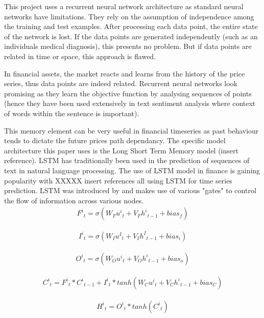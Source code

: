 \documentclass[11pt]{article}
\begin{document}
This project uses a recurrent neural network architecture as standard neural networks have limitations. They rely on the assumption of independence among the training and test examples. After processing each data point, the entire state of the network is lost. If the data points are generated independently (such as an individuals medical diagnosis), this presents no problem. But if data points are related in time or space, this approach is flawed.\par In financial assets, the market reacts and learns from the history of the price series, thus data points are indeed related. Recurrent neural networks look promising as they learn the objective function by analysing sequences of points (hence they have been used extensively in text sentiment analysis where context of words within the sentence is important). \par This memory element can be very useful in financial timeseries as past behaviour tends to dictate the future prices path dependancy. The specific model architecture this paper uses is the Long Short Term Memory model (insert reference). LSTM has traditionally been used in the prediction of sequences of text in natural language processing. The use of LSTM model in finance is gaining popularity with XXXXX insert references all using LSTM for time series prediction. LSTM was introduced by \cite{Hochreiter1997} and makes use of various "gates" to control the flow of information across various nodes.
\begin{align}
{F^{i}}_{t} =  \sigma(W_{F}{u^{i}}_{t} + V_{F}{h^{i}}_{t-1} + bias_{f})
\end{align} 

\begin{align}
{I^{i}}_{t} =  \sigma(W_{I}{u^{I}}_{t} + V_{I}{h^{I}}_{t-1} + bias_{i})
\end{align} 

\begin{align}
{O^{i}}_{t} =  \sigma(W_{O}{u^{i}}_{t} + V_{O}{h^{i}}_{t-1} + bias_{o})
\end{align} 

\begin{align}
{C^{i}}_{t} = {F^{i}}_{t} *{C^{i}}_{t-1} + {I^{i}}_{t} *tanh(W_{C}{u^{i}}_{t} + V_{C}{h^{i}}_{t-1} + bias_{C})
\end{align}

\begin{align}
{H^{i}}_{t} = {O^{i}}_{t}*tanh({C^{i}}_{t})
\end{align}
\end{document}
